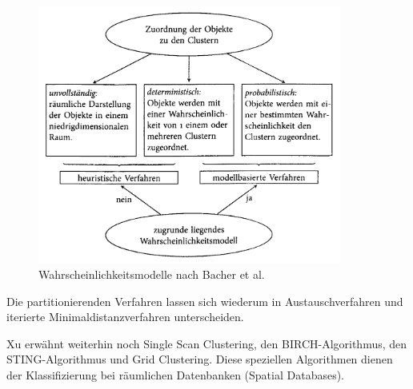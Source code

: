 \begin{figure}[h]
	\begin{center}
		\includegraphics[width=10cm]{pics/bac20.png}
	\end{center}
	\caption{Wahrscheinlichkeitsmodelle nach Bacher et al.}
	\label{pic:bac20}
\end{figure}

Die partitionierenden Verfahren lassen sich wiederum in Austauschverfahren und iterierte Minimaldistanzverfahren unterscheiden.

Xu \cite{Xu.1999} erwähnt weiterhin noch Single Scan Clustering, den BIRCH-Algorithmus, den STING-Algorithmus und Grid Clustering. Diese speziellen Algorithmen dienen der Klassifizierung bei räumlichen Datenbanken (Spatial Databases).